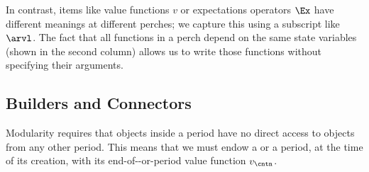 \documentclass[titlepage, headings=optiontotocandhead]{econark}
\newcommand{\ifpseudo}{\ifthenelse{\boolean{pseudocode}}}
\begin{document}
  In contrast, items like value functions $v$ or expectations operators $\Ex$ have different meanings at different perches; we capture this using a subscript like $\arvl$.  The fact that all functions in a perch depend on the same state variables (shown in the second column) allows us to write those functions without specifying their arguments.


\ifpseudo{
\nopagebreak
}{}

\hypertarget{transitions}{}
\subsection{Builders and Connectors}\label{subsec:transitions}\label{subsubsec:builders}

Modularity requires that objects inside a period have no direct access to objects from any other period.  This means that we must endow a {\stg} or a period, at the time of its creation, with its end-of-{\stg}-or-period value function $v_{\cntn}$.
\end{document}
